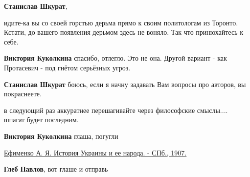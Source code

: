 \begin{itemize}
\begin{itemize}
\textbf{Станислав Шкурат}, 

идите-ка вы со своей горстью дерьма прямо к своим политологам из Торонто.
Кстати, до вашего появления дерьмом здесь не воняло. Так что принюхайтесь к
себе.

 
\textbf{Виктория Куколкина} спасибо, отлегло.
Это не она.
Другой вариант - как Протасевич - под гнётом серьёзных угроз.


 
\textbf{Станислав Шкурат} боюсь, если я начну задавать Вам вопросы про авторов, вы покраснеете.

 
в следующий раз аккуратнее перешагивайте через философские смыслы.... шпагат будет последним.

 
\textbf{Виктория Куколкина} \Smiley[1.0][yellow] глаша, погугли

\href{http://elib.shpl.ru/ru/nodes/14445-efimenko-a-ya-istoriya-ukrainy-i-ee-naroda-spb-1907}{%
Ефименко А. Я. История Украины и ее народа. - СПб., 1907.}

 
\textbf{Глеб Павлов}, вот глаше и отправь

 

\end{itemize}
\end{itemize}
